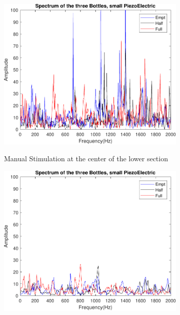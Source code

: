 \begin{figure}[]
    \centering
    \begin{subfigure}{0.45\textwidth}
        \centering
        \includegraphics[width=\linewidth]{Chapters/6CHP/Figures/ResultsSensors/PiezzMaBot.pdf}
        \caption{Manual Stimulation at the center of the lower section}{}
        \label{subfig:ResPiezzMaBot}
    \end{subfigure}
    \begin{subfigure}{0.45\textwidth}
        \centering
        \includegraphics[width=\linewidth]{Chapters/6CHP/Figures/ResultsSensors/PiezzAuBot.pdf}

\end{subfigure}
\end{figure}
